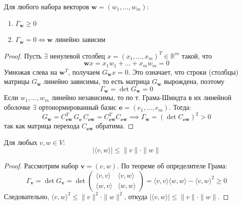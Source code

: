 \begin{theorem}
    Для любого набора векторов $\mathbf{w} = (w_1, \dots, w_m)$:
    \begin{enumerate}
        \item $\Gamma_{\mathbf{w}} \ge 0$
        \item $\Gamma_{\mathbf{w}} = 0 \iff \mathbf{w}$ линейно зависим
    \end{enumerate}
    \begin{proof}
        Пусть $\exists$ ненулевой столбец $x = (x_1, \dots, x_m)^T \in \mathbb{R}^m$ такой, что
        \[
            \mathbf{w}x = x_1 w_1 + \dots + x_m w_m = 0
        \]
        Умножая слева на $\mathbf{w}^T$, получаем $G_{\mathbf{w}}x = 0$.
        Это означает, что строки (столбцы) матрицы $G_{\mathbf{w}}$ линейно зависимы, то есть матрица $G_{\mathbf{w}}$ вырождена, поэтому
        \[
            \Gamma_{\mathbf{w}} = \det G_{\mathbf{w}} = 0
        \]
        Если $w_1, \dots, w_m$ линейно независимы, то по т. Грама-Шмидта в их линейной оболочке $\exists$ ортонормированный базис
        $\mathbf{e} = (e_1, \dots, e_m)$. Тогда:
        \[
            G_{\mathbf{w}} = C_{\mathbf{e}\mathbf{w}}^T\, G_{\mathbf{e}}\, C_{\mathbf{e}\mathbf{w}} = C_{\mathbf{e}
            \mathbf{w}}^T C_{\mathbf{e}\mathbf{w}}
            \implies \Gamma_{\mathbf{w}} = (\det C_{\mathbf{e}\mathbf{w}})^2 > 0
        \]
        так как матрица перехода $C_{\mathbf{e}\mathbf{w}}$ обратима.
    \end{proof}
\end{theorem}



\begin{theorem}
    Для любых $v, w \in V$:
    \[
        |\langle v, w \rangle| \le \|v\| \cdot \|w\|
    \]
    \begin{proof}
        Рассмотрим набор $\mathbf{v} = (v, w)$. По теореме об определителе Грама:
        \[
            \Gamma_{\mathbf{v}} = \det G_{\mathbf{v}}
            = \det \begin{pmatrix} \langle v,v\rangle & \langle v,w\rangle \\ \langle w,v\rangle & \langle w,
            w\rangle \end{pmatrix}
            = \langle v,v\rangle\langle w,w\rangle - \langle v,w\rangle^2 \ge 0
        \]
        Следовательно, $\langle v,w\rangle^2 \le \|v\|^2 \cdot \|w\|^2$, откуда $|\langle v,w\rangle| \le \|v\|\cdot\|w\|$.
    \end{proof}
\end{theorem}

